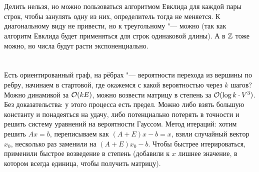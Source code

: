 \section{} %
Делить нельзя, но можно пользоваться алгоритмом Евклида для каждой пары строк, чтобы занулять одну из них, определитель тогда не меняется.
К диагональному виду не привести, но к треугольному "--- можно (так как алгоритм Евклида будет применяться для строк одинаковой длины).
А в $\mathbb{Z}$ тоже можно, но числа будут расти экспоненциально.

\section{} %
Есть ориентированный граф, на рёбрах "--- вероятности перехода из вершины по ребру,
начинаем в стартовой, где окажемся с какой вероятностью через $k$ шагов?
Можно динамикой за $\mathcal{O}(kE)$, можно возвести матрицу в степень за $\mathcal{O}(\log k \cdot V^3)$.
Без доказательства: у этого процесса есть предел.
Можно либо взять большую константу и понадеяться на удачу, либо потенциально потерять в точности и решить систему уравнений на вероятности Гауссом.
Метод итераций: хотим решить $Ax=b$, переписываем как $(A+E)x-b=x$, взяли случайный вектор $x_0$, несколько раз заменили на $(A+E)x_0-b$.
Чтобы быстрее итерироваться, применили быстрое возведение в степень (добавили к $x$ лишнее значение, в котором всегда единица, чтобы получить матрицу).
